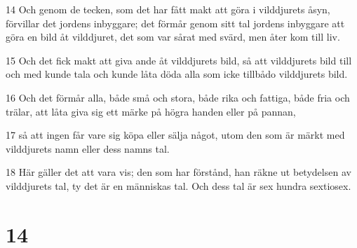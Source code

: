 \par 14 Och genom de tecken, som det har fått makt att göra i vilddjurets åsyn, förvillar det jordens inbyggare; det förmår genom sitt tal jordens inbyggare att göra en bild åt vilddjuret, det som var sårat med svärd, men åter kom till liv.
\par 15 Och det fick makt att giva ande åt vilddjurets bild, så att vilddjurets bild till och med kunde tala och kunde låta döda alla som icke tillbådo vilddjurets bild.
\par 16 Och det förmår alla, både små och stora, både rika och fattiga, både fria och trälar, att låta giva sig ett märke på högra handen eller på pannan,
\par 17 så att ingen får vare sig köpa eller sälja något, utom den som är märkt med vilddjurets namn eller dess namns tal.
\par 18 Här gäller det att vara vis; den som har förstånd, han räkne ut betydelsen av vilddjurets tal, ty det är en människas tal. Och dess tal är sex hundra sextiosex.

\chapter{14}


